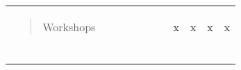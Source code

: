 \begin{longtable}[]{@{}lllllllllll@{}}
\begin{minipage}[t]{0.07\columnwidth}
\begin{quote}
Workshops \end{quote}\strut \end{minipage} & \begin{minipage}[t]{0.07\columnwidth}\raggedright \strut \end{minipage} & \begin{minipage}[t]{0.07\columnwidth}\raggedright \strut \end{minipage} & \begin{minipage}[t]{0.07\columnwidth}\raggedright \strut \end{minipage} & \begin{minipage}[t]{0.07\columnwidth}\raggedright \strut \end{minipage} & \begin{minipage}[t]{0.07\columnwidth}\raggedright \strut \end{minipage} & \begin{minipage}[t]{0.07\columnwidth}\raggedright \strut \end{minipage} & \begin{minipage}[t]{0.07\columnwidth}\raggedright x\strut \end{minipage} & \begin{minipage}[t]{0.07\columnwidth}\raggedright x\strut \end{minipage} & \begin{minipage}[t]{0.07\columnwidth}\raggedright x\strut \end{minipage} & \begin{minipage}[t]{0.07\columnwidth}\raggedright x\strut \end{minipage}\tabularnewline \begin{minipage}[t]{0.07\columnwidth}\raggedright \begin{quote}

\end{quote}
\end{minipage}
\end{longtable}
